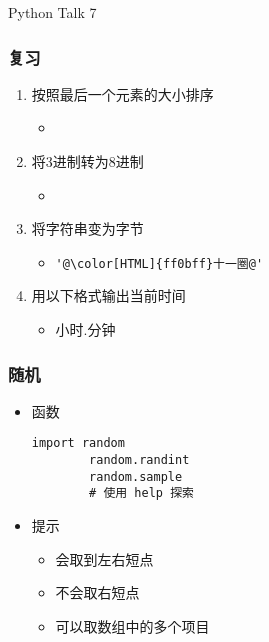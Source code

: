 


\begin{CJK}{UTF8}{gbsn}

\PreFirstFrame
\begin{frame} [fragile]
	\centerline{\fontsize{42}{42}\selectfont Python Talk 7}
\end{frame}
\PostFirstFrame

\begin{frame} [fragile]
	\frametitle{复习}
	\linespread{1.25}
	\begin{enumerate}
	\item 按照最后一个元素的大小排序
		\begin{itemize}
		\item {}
		\end{itemize}
	\item 将3进制转为8进制
		\begin{itemize}
		\item {}
		\end{itemize}
	\item 将字符串变为字节
		\begin{itemize}
		\item \begin{lstlisting}[style=pythonstyle, gobble=8, escapechar=@]
		'@\color[HTML]{ff0bff}十一圈@'
		\end{lstlisting}
		\end{itemize}
	\item 用以下格式输出当前时间
		\begin{itemize}
		\item 小时.分钟
		\end{itemize}
	\end{enumerate}
\end{frame}

\begin{frame} [fragile]
	\frametitle{随机}
	\linespread{1.25}
	\begin{itemize}
	\item 函数
		\begin{lstlisting}[style=pythonstyle, gobble=8, texcl]
		import random
		random.randint
		random.sample
		# 使用 help 探索
		\end{lstlisting}
	\item 提示
		\begin{itemize}
		\item {} 会取到左右短点
		\item {} 不会取右短点
		\item {} 可以取数组中的多个项目
		\end{itemize}
	\end{itemize}
\end{frame}


\end{CJK}
